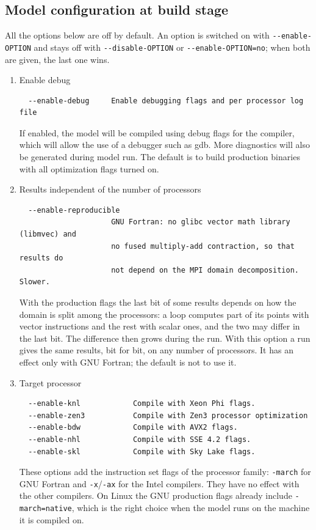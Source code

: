 \subsection{Model configuration at build stage}
\label{modconf}

All the options below are off by default. An option is switched on with
\verb=--enable-OPTION= and stays off with \verb=--disable-OPTION= or
\verb|--enable-OPTION=no|; when both are given, the last one wins.

\begin{enumerate}
\item Enable debug
\begin{Verbatim}
  --enable-debug     Enable debugging flags and per processor log file
\end{Verbatim}
If enabled, the model will be compiled using debug flags for the compiler,
which will allow the use of a debugger such as gdb. More diagnostics will
also be generated during model run.
The default is to build production binaries with all optimization flags
turned on.

\item Results independent of the number of processors
\begin{Verbatim}
  --enable-reproducible
                     GNU Fortran: no glibc vector math library (libmvec) and
                     no fused multiply-add contraction, so that results do
                     not depend on the MPI domain decomposition. Slower.
\end{Verbatim}
With the production flags the last bit of some results depends on how the
domain is split among the processors: a loop computes part of its points
with vector instructions and the rest with scalar ones, and the two may
differ in the last bit. The difference then grows during the run. With
this option a run gives the same results, bit for bit, on any number of
processors. It has an effect only with GNU Fortran; the default is not to
use it.

\item Target processor
\begin{Verbatim}
  --enable-knl            Compile with Xeon Phi flags.
  --enable-zen3           Compile with Zen3 processor optimization
  --enable-bdw            Compile with AVX2 flags.
  --enable-nhl            Compile with SSE 4.2 flags.
  --enable-skl            Compile with Sky Lake flags.
\end{Verbatim}
These options add the instruction set flags of the processor family:
\verb=-march= for GNU Fortran and \verb=-x=/\verb=-ax= for the Intel
compilers. They have no effect with the other compilers. On Linux the GNU
production flags already include \verb|-march=native|, which is the right
choice when the model runs on the machine it is compiled on.


\end{enumerate}
